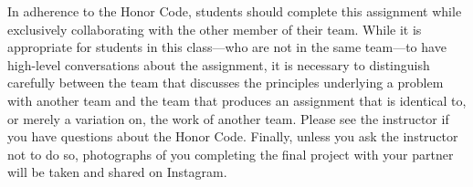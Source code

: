 In adherence to the Honor Code, students should complete this assignment while exclusively collaborating with the other
member of their team. While it is appropriate for students in this class---who are not in the same team---to have
high-level conversations about the assignment, it is necessary to distinguish carefully between the team that discusses
the principles underlying a problem with another team and the team that produces an assignment that is identical to, or
merely a variation on, the work of another team. Please see the instructor if you have questions about the Honor Code.
Finally, unless you ask the instructor not to do so, photographs of you completing the final project with your partner
will be taken and shared on Instagram.


  
